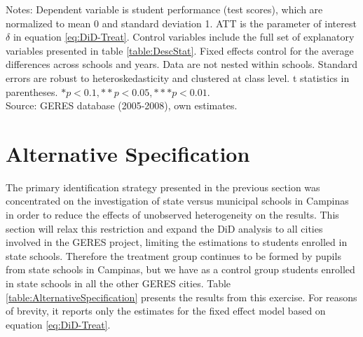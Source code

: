 \documentclass[a4paper, 12pt]{article}
\begin{document}
\begin{table}[H]
\begin{subtable}[t]{\linewidth}
\begin{adjustbox}{max width=\textwidth}
\end{adjustbox}
\end{subtable}           
\begin{minipage}{1\textwidth}            \scriptsize Notes: Dependent variable is student performance (test scores), which are normalized to mean 0 and standard deviation 1. ATT is the parameter of interest $\delta$ in equation \eqref{eq:DiD-Treat}. Control variables include the full set of explanatory variables presented in table \ref{table:DescStat}. Fixed effects control for the average differences across schools and years. Data are not nested within schools. Standard errors are robust to heteroskedasticity and clustered at class level. t statistics in parentheses. \( * p<0.1, ** p<0.05, *** p<0.01 \). \\                    
Source: GERES database (2005-2008), own estimates.             \end{minipage}                \end{table}








\section{Alternative Specification} \label{Paper3-Alternative}
 
The primary identification strategy presented in the previous section was concentrated on the investigation of state versus municipal schools in Campinas in order to reduce the effects of unobserved heterogeneity on the results. This section will relax this restriction and expand the DiD analysis to all cities involved in the GERES project, limiting the estimations to students enrolled in state schools. Therefore the treatment group continues to be formed by pupils from state schools in Campinas, but we have as a control group students enrolled in state schools in all the other GERES cities. Table \ref{table:AlternativeSpecification} presents the results from this exercise. For reasons of brevity, it reports only the estimates for the fixed effect model based on equation \eqref{eq:DiD-Treat}. 
\end{document}
